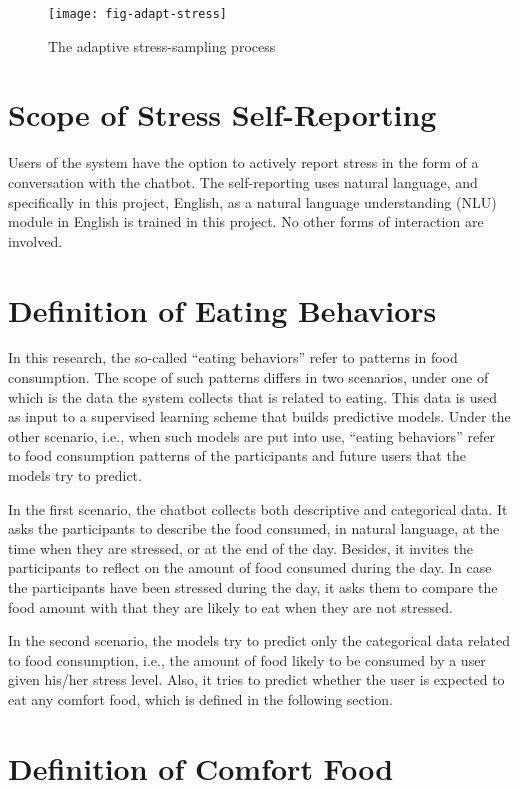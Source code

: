 \begin{figure}[ht]
  \centering
  \texttt{[image: fig-adapt-stress]}
	\caption{The adaptive stress-sampling process}
	\label{fig:adapt-stress}
\end{figure}

\section{Scope of Stress Self-Reporting}

Users of the system have the option to actively report stress in the form of a conversation with the chatbot. The self-reporting uses natural language, and specifically in this project, English, as a natural language understanding (NLU) module in English is trained in this project. No other forms of interaction are involved.

\section{Definition of Eating Behaviors}

In this research, the so-called “eating behaviors” refer to patterns in food consumption. The scope of such patterns differs in two scenarios, under one of which is the data the system collects that is related to eating. This data is used as input to a supervised learning scheme that builds predictive models. Under the other scenario, i.e., when such models are put into use, “eating behaviors” refer to food consumption patterns of the participants and future users that the models try to predict.

In the first scenario, the chatbot collects both descriptive and categorical data. It asks the participants to describe the food consumed, in natural language, at the time when they are stressed, or at the end of the day. Besides, it invites the participants to reflect on the amount of food consumed during the day. In case the participants have been stressed during the day, it asks them to compare the food amount with that they are likely to eat when they are not stressed.

In the second scenario, the models try to predict only the categorical data related to food consumption, i.e., the amount of food likely to be consumed by a user given his/her stress level. Also, it tries to predict whether the user is expected to eat any comfort food, which is defined in the following section.

\section{Definition of Comfort Food}

